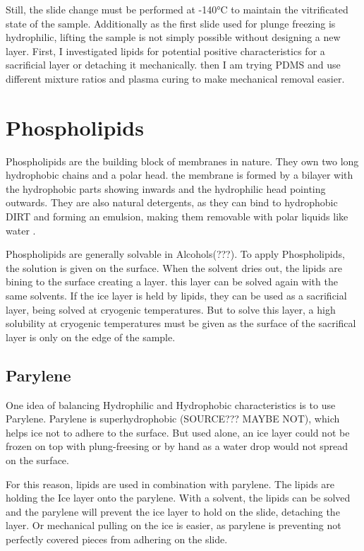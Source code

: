Still, the slide change must be performed at -140°C to maintain the vitrificated state of the sample. Additionally as the first slide used for plunge freezing is hydrophilic, lifting the sample is not simply possible without designing a new layer. First, I investigated lipids for potential positive characteristics for a sacrificial layer or detaching it mechanically. then I am trying PDMS and use different mixture ratios and plasma curing to make mechanical removal easier.

\section{Phospholipids}

Phospholipids are the building block of membranes in nature. They own two long hydrophobic chains and a polar head. the membrane is formed by a bilayer with the hydrophobic parts showing inwards and the hydrophilic head pointing outwards. They are also natural detergents, as they can bind to hydrophobic DIRT and forming an emulsion, making them removable with polar liquids like water \cite{SriramaM.BhairiPh.D..}.

Phospholipids are generally solvable in Alcohols(???). To apply Phospholipids, the solution is given on the surface. When the solvent dries out, the lipids are bining to the surface creating a layer. this layer can be solved again with the same solvents. If the ice layer is held by lipids, they can be used as a sacrificial layer, being solved at cryogenic temperatures. But to solve this layer, a high solubility at cryogenic temperatures must be given as the surface of the sacrifical layer is only on the edge of the sample.

\subsection{Parylene}

One idea of balancing Hydrophilic and Hydrophobic characteristics is to use Parylene. Parylene is superhydrophobic (SOURCE??? MAYBE NOT), which helps ice not to adhere to the surface. But used alone, an ice layer could not be frozen on top with plung-freesing or by hand as a water drop would not spread on the surface. 

For this reason, lipids are used in combination with parylene. The lipids are holding the Ice layer onto the parylene. With a solvent, the lipids can be solved and the parylene will prevent the ice layer to hold on the slide, detaching the layer. Or mechanical pulling on the ice is easier, as parylene is preventing not perfectly covered pieces from adhering on the slide.

